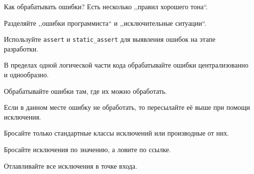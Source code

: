 \documentclass{beamer}
\begin{document}
\begin{frame}[fragile]{Как обрабатывать ошибки?}
    Есть несколько ,,правил хорошего тона``.
    
        \fakeitem Разделяйте ,,ошибки программиста``
            и ,,исключительные ситуации``.
            
        \fakeitem Используйте \texttt{assert} и \texttt{static\_assert} 
        для выявления ошибок на этапе разработки.
        
        \fakeitem В пределах одной логической части кода 
        обрабатывайте ошибки централизованно и однообразно.

        \fakeitem Обрабатывайте ошибки там, где их можно обработать.
        
        \fakeitem Если в данном месте ошибку не обработать, то
             пересылайте её выше при помощи исключения.
 
        \fakeitem Бросайте только стандартные классы исключений или производные от них.

        \fakeitem Бросайте исключения по значению, а ловите по ссылке.

        \fakeitem Отлавливайте все исключения в точке входа.
           



    
    

\end{frame}
\end{document}
